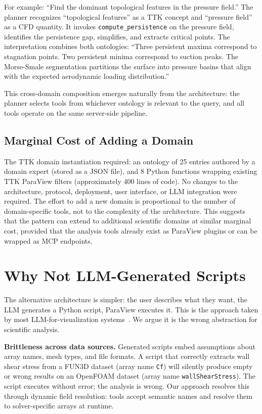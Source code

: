 \documentclass{vgtc}                          %
\begin{document}
For example: ``Find the dominant topological features in the pressure field.''
The planner recognizes ``topological features'' as a TTK concept and ``pressure
field'' as a CFD quantity.
It invokes \texttt{compute\_persistence} on the pressure field, identifies the
persistence gap, simplifies, and extracts critical points.
The interpretation combines both ontologies: ``Three persistent maxima
correspond to stagnation points.
Two persistent minima correspond to suction peaks.
The Morse-Smale segmentation partitions the surface into pressure basins that
align with the expected aerodynamic loading distribution.''

This cross-domain composition emerges naturally from the architecture: the
planner selects tools from whichever ontology is relevant to the query, and
all tools operate on the same server-side pipeline.

\subsection{Marginal Cost of Adding a Domain}

The TTK domain instantiation required:
an ontology of 25 entries authored by a domain expert (stored as a JSON file),
and 8 Python functions wrapping existing TTK ParaView filters (approximately
400 lines of code).
No changes to the architecture, protocol, deployment, user interface, or LLM
integration were required.
The effort to add a new domain is proportional to the number of domain-specific
tools, not to the complexity of the architecture.
This suggests that the pattern can extend to additional scientific domains at
similar marginal cost, provided that the analysis tools already exist as
ParaView plugins or can be wrapped as MCP endpoints.


\section{Why Not LLM-Generated Scripts}

The alternative architecture is simpler: the user describes what they want, the
LLM generates a Python script, ParaView executes it.
This is the approach taken by most LLM-for-visualization
systems~\cite{Chen:2024:ChatVis,Li:2025:VisGene,Zhao:2026:RAG}.
We argue it is the wrong abstraction for scientific analysis.

\textbf{Brittleness across data sources.}
Generated scripts embed assumptions about array names, mesh types, and file
formats.
A script that correctly extracts wall shear stress from a FUN3D dataset (array
name \texttt{Cf}) will silently produce empty or wrong results on an OpenFOAM
dataset (array name \texttt{wallShearStress}).
The script executes without error; the analysis is wrong.
Our approach resolves this through dynamic field resolution: tools accept
semantic names and resolve them to solver-specific arrays at runtime.
\end{document}
